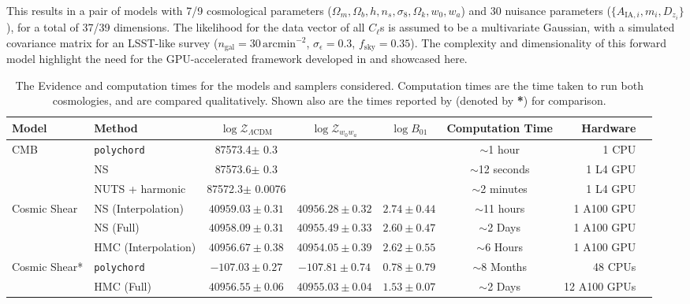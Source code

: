 \documentclass[twocolumn]{openjournal}
\begin{document}
This results in a pair of models with 7/9 cosmological parameters ($\Omega_m, \Omega_b, h, n_s, \sigma_8, \Omega_k, w_0, w_a$) and 30 nuisance parameters ($\{A_{\text{IA},i},m_i,D_{z_i}\}$), for a total of 37/39 dimensions. The likelihood for the data vector of all $C_\ell$s is assumed to be a multivariate Gaussian, with a simulated covariance matrix for an LSST-like survey ($n_{\text{gal}} = 30\,\text{arcmin}^{-2}$, $\sigma_{\epsilon} = 0.3$, $f_\text{sky} = 0.35$). The complexity and dimensionality of this forward model highlight the need for the GPU-accelerated framework developed in \cite{NSSyallup} and showcased here.
\begin{table*}[ht]
\caption{The Evidence and computation times for the models and samplers considered. Computation times are the time taken to run both cosmologies, and are compared qualitatively. Shown also are the times reported by \cite{Piras_2024} (denoted by \textbf{*}) for comparison.}
\label{tab:results} 
\vskip 0.15in
\begin{center}
\begin{small}
\begin{tabular}{llcc|c|crr}
\toprule
Model  & Method & $\log \mathcal{Z}_{\Lambda\text{CDM}}$ & $\log \mathcal{Z}_{w_0w_a}$ & $\log B_{01}$ & Computation Time & Hardware \\ 
\midrule
CMB  &  \texttt{polychord} & 87573.4$\pm$ 0.3&  &&  $\sim$1 hour  & 1 CPU \\
  &  NS & 87573.6$\pm$ 0.3&  & & $\sim$12 seconds  & 1 L4 GPU \\
 &  NUTS + harmonic & 87572.3$\pm$ 0.0076& & &  $\sim$2 minutes  & 1 L4 GPU \\
\midrule
Cosmic Shear  & NS (Interpolation) &  $40959.03 \pm 0.31$ & $40956.28 \pm 0.32$ & $2.74 \pm 0.44$ & $\sim$11 hours  & 1 A100 GPU &  \\
 &   NS (Full) &  $40958.09 \pm 0.31$ & $40955.49 \pm 0.33$ &$ 2.60 \pm 0.47$& $\sim$2 Days  & 1 A100 GPU &  \\
    &  HMC (Interpolation) & $40956.67\pm  0.38$ &  $40954.05 \pm 0.39 $& $2.62 \pm 0.55 $ & $\sim$6 Hours & 1 A100 GPU  \\ \midrule
Cosmic Shear*   &  \texttt{polychord} & $-107.03\pm 0.27$& $-107.81 \pm 0.74$& $0.78 \pm 0.79$& $\sim$8 Months  & 48 CPUs \\
   &  HMC (Full) & $40956.55 \pm 0.06$& $40955.03 \pm 0.04$ & $1.53 \pm 0.07$ & $\sim$2 Days &12 A100 GPUs \\ 

\bottomrule
\end{tabular}
\end{small}
\end{center}
\vskip -0.1in
\end{table*}
\end{document}
